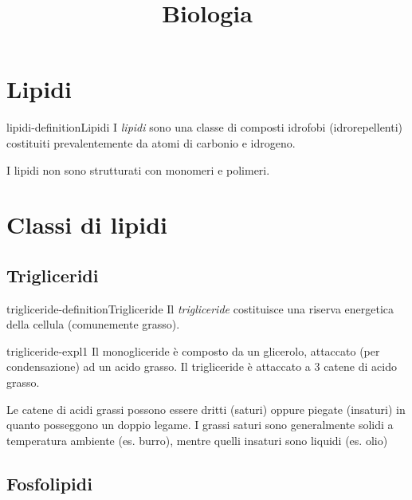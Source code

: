 \documentclass[preview]{standalone}
\begin{document}
\title{Biologia}
\genpage

\section{Lipidi}

\begin{snippetdefinition}{lipidi-definition}{Lipidi}
    I \textit{lipidi} sono una classe di composti idrofobi (idrorepellenti)
    costituiti prevalentemente da atomi di carbonio e idrogeno.
\end{snippetdefinition}

\begin{plainhtml}
    I lipidi non sono strutturati con monomeri e polimeri.
\end{plainhtml}

\section{Classi di lipidi}

\subsection{Trigliceridi}

\begin{snippetdefinition}{trigliceride-definition}{Trigliceride}
    Il \textit{trigliceride} costituisce una riserva energetica della cellula (comunemente grasso).
\end{snippetdefinition}

\begin{snippet}{trigliceride-expl1}
    Il monogliceride è composto da un glicerolo, attaccato (per condensazione) ad un acido grasso.
    Il trigliceride è attaccato a 3 catene di acido grasso.

    Le catene di acidi grassi possono essere dritti (saturi) oppure piegate (insaturi)
    in quanto posseggono un doppio legame.
    I grassi saturi sono generalmente solidi a temperatura ambiente (es. burro),
    mentre quelli insaturi sono liquidi (es. olio)
\end{snippet}


\subsection{Fosfolipidi}
\end{document}
